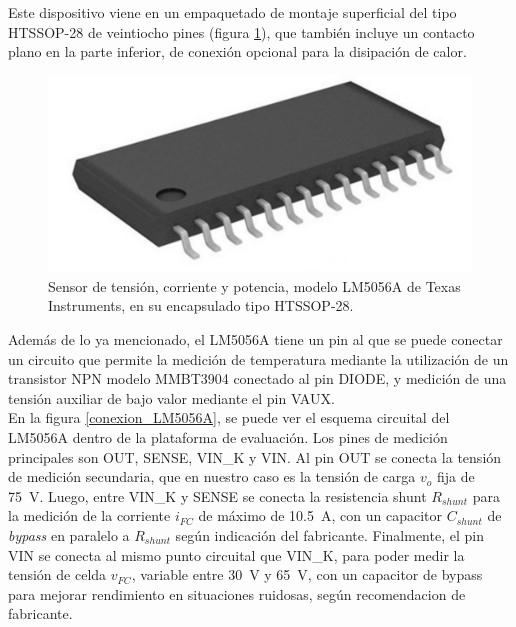 Este dispositivo viene en un empaquetado de montaje superficial del tipo HTSSOP-28 de veintiocho pines (figura \ref{encapsulado_LM5056}), que también incluye un contacto plano en la parte inferior, de conexión opcional para la disipación de calor.\\

\begin{figure}[h]
    \centering
    \includegraphics[scale=0.15]{Imagenes/HTSSOP.jpg}
    \caption{Sensor de tensión, corriente y potencia, modelo LM5056A de Texas Instruments, en su encapsulado tipo HTSSOP-28.}
    \label{encapsulado_LM5056}
\end{figure}

Además de lo ya mencionado, el LM5056A tiene un pin al que se puede conectar un circuito que permite la medición de temperatura mediante la utilización de un transistor NPN modelo MMBT3904 conectado al pin DIODE, y medición de una tensión auxiliar de bajo valor mediante el pin VAUX.\\

En la figura \ref{conexion_LM5056A}, se puede ver el esquema circuital del LM5056A dentro de la plataforma de evaluación. Los pines de medición principales son OUT, SENSE, VIN\_K y VIN. Al pin OUT se conecta la tensión de medición secundaria, que en nuestro caso es la tensión de carga $v_o$ fija de \SI[]{75}[]{\volt}. Luego, entre VIN\_K y SENSE se conecta la resistencia shunt $R_{shunt}$ para la medición de la corriente $i_{FC}$ de máximo de \SI[]{10.5}[]{\ampere}, con un capacitor $C_{shunt}$ de \textit{bypass} en paralelo a $R_{shunt}$ según indicación del fabricante. Finalmente, el pin VIN se conecta al mismo punto circuital que VIN\_K, para poder medir la tensión de celda $v_{FC}$, variable entre \SI[]{30}[]{\volt} y \SI[]{65}[]{\volt}, con un capacitor de bypass para mejorar rendimiento en situaciones ruidosas, según recomendacion de fabricante.\\

